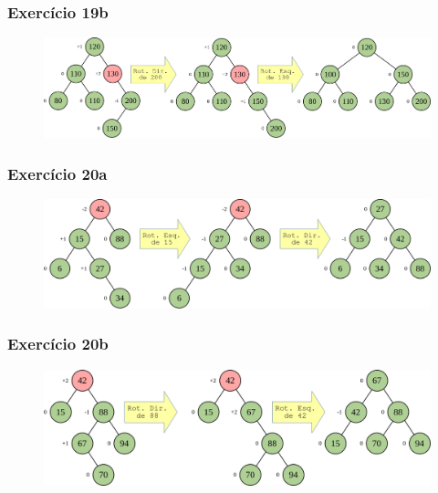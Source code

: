 \documentclass[aspectratio=169]{beamer}
\begin{document}
\begin{frame}[fragile]\frametitle{Exercício 19b}
\begin{figure}[h]
	\centering
	\includegraphics[height=0.40\paperheight]{imagens/avl18-rotdiresq130.png}
\end{figure}
\end{frame}

\begin{frame}[fragile]\frametitle{Exercício 20a}
\begin{figure}[h]
	\centering
	\includegraphics[height=0.40\paperheight]{imagens/avl19-add34.png}
\end{figure}
\end{frame}

\begin{frame}[fragile]\frametitle{Exercício 20b}
\begin{figure}[h]
	\centering
	\includegraphics[height=0.40\paperheight]{imagens/avl20-add70.png}
\end{figure}
\end{frame}
\end{document}
